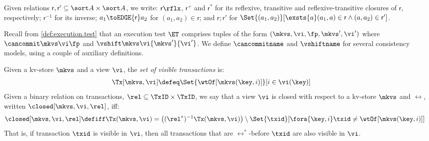 Given relations \(\mathsf r, \mathsf r' \subseteq \sort A \times \sort A\),
we write:  \(\mathsf r\rflx\), \(\mathsf r^+\) and \(\mathsf r^*\) for its reflexive, transitive and reflexive-transitive closures of \(\mathsf r\), respectively;
\(\mathsf r^{-1}\) for its inverse;
\(a_1 \toEDGE{\mathsf r} a_2\) for \((a_1, a_2) \in \mathsf r\);
and \( \mathsf r; \mathsf r'\) for \( \Set{(a_1,a_2)}[\exsts{a} (a_1,a) \in \mathsf r\land (a,a_2) \in \mathsf r']\).

Recall from \cref{def:execution.test} that an execution test \(\ET\)
comprises  tuples of the form \((\mkvs,\vi, \fp, \mkvs', \vi')\) 
where  \(\cancommit \mkvs \vi \fp\) and \(\vshift \mkvs \vi {\mkvs'} {\vi'}\). 
We define \(\cancommitname\) and \(\vshiftname\) for several consistency
models, using a couple of auxiliary definitions. 


Given a kv-store \(\mkvs\) and a view \(\vi\), the {\em set of visible
transactions} is: 
{%
\displaymathfont
\begin{align*}
\Tx[\mkvs, \vi] & \defeq
\Set{\wtOf[\mkvs(\key, i)] }[ i \in \vi(\key)] 
\end{align*}
}%
%
%
%
%
%
Given a binary relation on transactions, \(\rel \subseteq \TxID \times \TxID\), we say that a view \(\vi\) is closed with respect to a kv-store \(\mkvs\) and \(\rel\), written \(\closed[\mkvs,\vi,\rel]\), iff:  
{%
\displaymathfont
\begin{align*}
	\closed[\mkvs,\vi,\rel]
	\defiff
	\Tx(\mkvs, \vi) = 
	\left( (\rel^*)^{-1} \Tx(\mkvs, \vi) \right) \setminus \Set{\txid }[ \fora{\key,i} \txid \neq \wtOf[\mkvs(\key,i)] ]
\end{align*}
}%
That is, if transaction \(\txid\) is visible in \(\vi\), then all transactions that are \(\rel^*\)-before \(\txid\) are also visible in \(\vi\).

